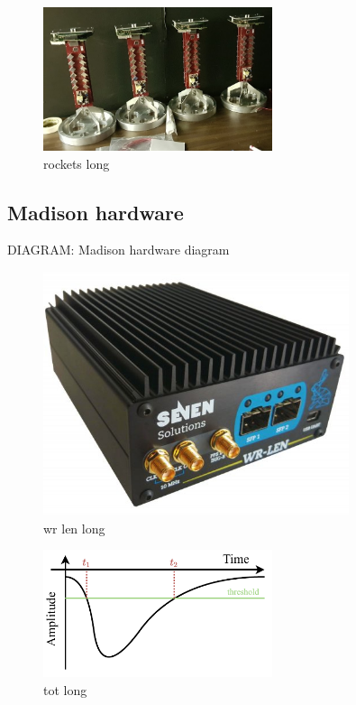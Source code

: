 \begin{figure} %
    \includegraphics[width=0.6\textwidth]{diagrams/6-daq/rockets.jpg}
    \caption[rockets short]
    {rockets long}
    \label{fig:rockets}
\end{figure}

\subsection{Madison hardware} %
\label{sec:daq_hard_madison} %

DIAGRAM: Madison hardware diagram

\begin{figure} %
    \includegraphics[width=0.8\textwidth]{diagrams/6-daq/wr_len.jpg}
    \caption[wr len short]
    {wr len long}
    \label{fig:wr_len}
\end{figure}

\begin{figure} %
    \includegraphics[width=0.6\textwidth]{diagrams/6-daq/tot.pdf}
    \caption[tot short]
    {tot long}
    \label{fig:tot}
\end{figure}

